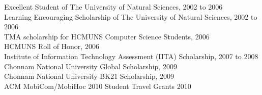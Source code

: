 \documentclass[margin,line]{resume}
\begin{document}
\begin{resume}
    Excellent Student of The University of Natural Sciences, 2002 to 2006                           \vspace{1mm}\\%
    Learning Encouraging Scholarship of The University of Natural Sciences, 2002 to 2006            \vspace{1mm}\\%
    TMA scholarship for HCMUNS Computer Science Students, 2006                                      \vspace{1mm}\\%
    HCMUNS Roll of Honor, 2006                                                                      \vspace{1mm}\\%
    Institute of Information Technology Assessment (IITA) Scholarship, 2007 to 2008                 \vspace{1mm}\\%
    Chonnam National University Global Scholarship, 2009                                            \vspace{1mm}\\%
    Chonnam National University BK21 Scholarship, 2009                                              \vspace{1mm}\\%
    ACM MobiCom/MobiHoc 2010 Student Travel Grants 2010

\end{resume}
\end{document}
